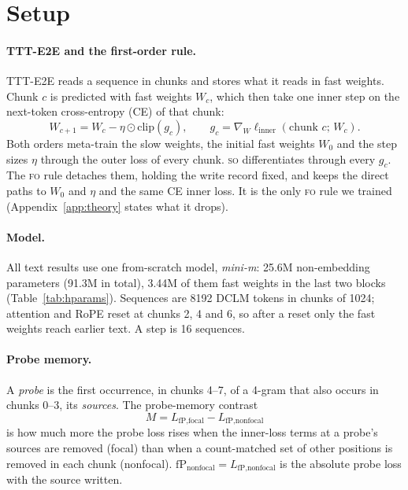 \documentclass[11pt]{article}
\newcommand{\FO}{\textsc{fo}}
\newcommand{\SO}{\textsc{so}}
\begin{document}
\section{Setup}
\label{sec:setup}

\paragraph{TTT-E2E and the first-order rule.}
TTT-E2E reads a sequence in chunks and stores what it reads in fast weights. Chunk $c$ is predicted
with fast weights $W_c$, which then take one inner step on the next-token cross-entropy (CE) of that
chunk:
\begin{equation}
  W_{c+1} = W_c - \eta\odot\mathrm{clip}(g_c), \qquad
  g_c = \nabla_W \ell_{\text{inner}}(\text{chunk } c;\, W_c).
  \label{eq:inner}
\end{equation}
Both orders meta-train the slow weights, the initial fast weights $W_0$ and the step sizes $\eta$
through the outer loss of every chunk. \SO{} differentiates through every $g_c$. The \FO{} rule
detaches them, holding the write record fixed, and keeps the direct paths to $W_0$ and $\eta$ and the
same CE inner loss. It is the only \FO{} rule we trained (Appendix~\ref{app:theory} states what it
drops).

\paragraph{Model.}
All text results use one from-scratch model, \emph{mini-m}: 25.6M non-embedding parameters (91.3M in
total), 3.44M of them fast weights in the last two blocks (Table~\ref{tab:hparams}). Sequences are
8192 DCLM tokens \citep{li2024dclm} in chunks of 1024; attention and RoPE reset at chunks 2, 4 and 6,
so after a reset only the fast weights reach earlier text. A step is 16 sequences.

\paragraph{Probe memory.}
A \emph{probe} is the first occurrence, in chunks 4--7, of a 4-gram that also occurs in chunks 0--3,
its \emph{sources}. The probe-memory contrast
\begin{equation}
  M = L_{\text{fP,focal}} - L_{\text{fP,nonfocal}}
  \label{eq:M}
\end{equation}
is how much more the probe loss rises when the inner-loss terms at a probe's sources are removed
(focal) than when a count-matched set of other positions is removed in each chunk (nonfocal).
$\mathrm{fP}_{\text{nonfocal}}=L_{\text{fP,nonfocal}}$ is the absolute probe loss with the source
written.
\end{document}
